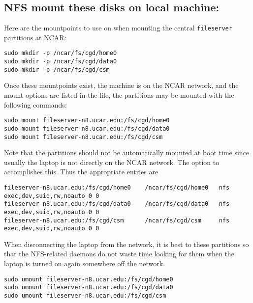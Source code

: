 \documentclass[12pt,twoside]{article}
\begin{document}
\subsection{NFS mount these disks on local machine:}\label{sxn:nfs_mnt}
Here are the mountpoints to use on  when mounting the
central \verb'fileserver' partitions at NCAR:
\begin{verbatim}
sudo mkdir -p /ncar/fs/cgd/home0
sudo mkdir -p /ncar/fs/cgd/data0
sudo mkdir -p /ncar/fs/cgd/csm
\end{verbatim}
Once these mountpoints exist, the machine is on the NCAR network,
and the mount options are listed in the  file,
the partitions may be mounted with the following commands:
\begin{verbatim}
sudo mount fileserver-n8.ucar.edu:/fs/cgd/home0
sudo mount fileserver-n8.ucar.edu:/fs/cgd/data0
sudo mount fileserver-n8.ucar.edu:/fs/cgd/csm
\end{verbatim}
Note that the partitions should not be automatically mounted at
boot time since usually the laptop is not directly on the NCAR
network.
The  option to  accomplishes this.
Thus the appropriate  entries are
\begin{verbatim}
fileserver-n8.ucar.edu:/fs/cgd/home0    /ncar/fs/cgd/home0   nfs     exec,dev,suid,rw,noauto 0 0
fileserver-n8.ucar.edu:/fs/cgd/data0    /ncar/fs/cgd/data0   nfs     exec,dev,suid,rw,noauto 0 0
fileserver-n8.ucar.edu:/fs/cgd/csm      /ncar/fs/cgd/csm     nfs     exec,dev,suid,rw,noauto 0 0
\end{verbatim}
When disconnecting the laptop from the network, it is best to 
 these partitions so that the NFS-related daemons do
not waste time looking for them when the laptop is turned on again
somewhere off the network.
\begin{verbatim}
sudo umount fileserver-n8.ucar.edu:/fs/cgd/home0
sudo umount fileserver-n8.ucar.edu:/fs/cgd/data0
sudo umount fileserver-n8.ucar.edu:/fs/cgd/csm
\end{verbatim}
\end{document}
